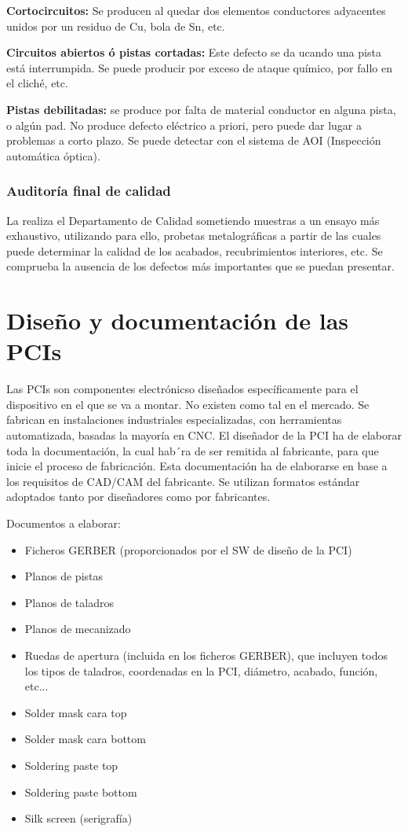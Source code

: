 \textbf{Cortocircuitos:} Se producen al quedar dos elementos conductores adyacentes unidos por un residuo de Cu, bola de Sn, etc.

\textbf{Circuitos abiertos ó pistas cortadas:} Este defecto se da ucando una pista está interrumpida. Se puede producir por exceso de ataque químico, por fallo en el cliché, etc.

\textbf{Pistas debilitadas:} se produce por falta de material conductor en alguna pista, o algún pad. No produce defecto eléctrico a priori, pero puede dar lugar a problemas a corto plazo. Se puede detectar con el sistema de AOI (Inspección automática óptica).

\subsubsection{Auditoría final de calidad}
La realiza el Departamento de Calidad sometiendo muestras a un ensayo más exhaustivo, utilizando para ello, probetas metalográficas a partir de las cuales puede determinar la calidad de los acabados, recubrimientos interiores, etc. Se comprueba la ausencia de los defectos más importantes que se puedan presentar.

\section{Diseño y documentación de las PCIs}
Las PCIs son componentes electrónicso diseñados específicamente para el dispositivo en el que se va a montar. No existen como tal en el mercado. Se fabrican en instalaciones industriales especializadas, con herramientas automatizada, basadas la mayoría en CNC. El diseñador de la PCI ha de elaborar toda la documentación, la cual hab´ra de ser remitida al fabricante, para que inicie el proceso de fabricación. Esta documentación ha de elaborarse en base a los requisitos de CAD/CAM del fabricante. Se utilizan formatos estándar adoptados tanto por diseñadores como por fabricantes.

Documentos a elaborar:
\begin{itemize}
    \item Ficheros GERBER (proporcionados por el SW de diseño de la PCI)
    \item Planos de pistas
    \item Planos de taladros
    \item Planos de mecanizado
    \item Ruedas de apertura (incluida en los ficheros GERBER), que incluyen todos los tipos de taladros, coordenadas en la PCI, diámetro, acabado, función, etc...
    \item Solder mask cara top
    \item Solder mask cara bottom
    \item Soldering paste top
    \item Soldering paste bottom
    \item Silk screen (serigrafía)
\end{itemize}

